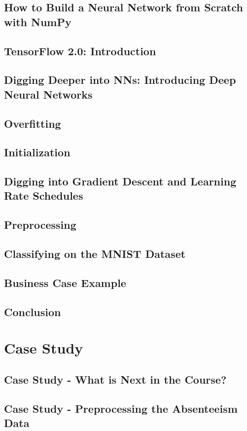 \documentclass[12pt, a4paper]{article}
\begin{document}
\subsection{How to Build a Neural Network from Scratch with NumPy}
\subsection{TensorFlow 2.0: Introduction}
\subsection{Digging Deeper into NNs: Introducing Deep Neural Networks}
\subsection{Overfitting}
\subsection{Initialization}
\subsection{Digging into Gradient Descent and Learning Rate Schedules}
\subsection{Preprocessing}
\subsection{Classifying on the MNIST Dataset}
\subsection{Business Case Example}
\subsection{Conclusion}
\pagebreak

\section{Case Study}
\subsection{Case Study - What is Next in the Course?}
\subsection{Case Study - Preprocessing the Absenteeism Data}
\end{document}
